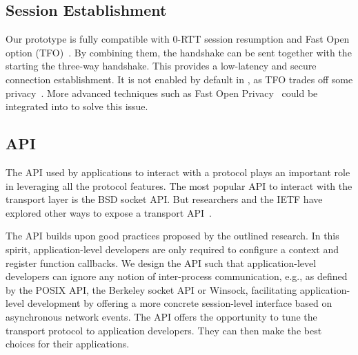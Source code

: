 \subsection{\tcpls Session Establishment}

Our prototype is fully compatible with  0-RTT session resumption
and \tcp Fast Open option (TFO)~\cite{radhakrishnan2011tcp}. By combining them,
the \tcpls handshake can be sent together with the \tcp \syn starting
the three-way handshake. This provides a low-latency and secure connection establishment. It is not enabled by default in \tcpls, as TFO trades off some privacy~\cite{sy2020enhanced}. More advanced techniques such as \tcp Fast Open Privacy~\cite{sy2020enhanced} could be integrated into \tcpls to solve this issue.

\subsection{\tcpls API}
\label{sec-api}

The API used by applications to interact with a protocol plays an important role in leveraging all the protocol features. The most popular API to interact with the transport layer is the BSD socket API. But researchers and the IETF have explored other ways to expose a transport API~\cite{draft-ietf-taps-arch,hruby2014sockets,rfc6458,schmidt2013socket}.

The \tcpls API builds upon good practices proposed by the outlined research.
In this spirit, application-level developers are only required to configure a \tcpls context and register function callbacks. We design the \tcpls API such
that application-level developers can ignore any notion of inter-process communication, e.g., as defined by the POSIX API, the Berkeley socket API or
Winsock, facilitating application-level development by offering a more concrete
session-level interface based on asynchronous network events. The \tcpls API offers the opportunity to tune the transport protocol to application developers. They can then make the best choices for their applications.


